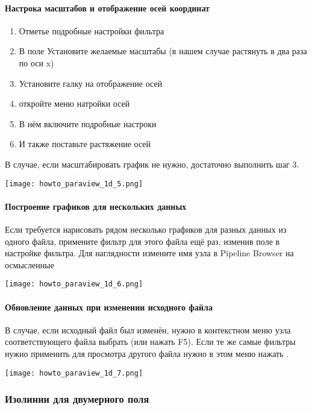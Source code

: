 \paragraph{Настрока масштабов и отображение осей координат}
\begin{enumerate}
\item Отметье подробные настройки фильтра
\item В поле  Установите желаемые масштабы (в нашем случае растянуть в два раза по оси x)
\item Установите галку на отображение осей
\item откройте меню натройки осей
\item В нём включите подробные настроки
\item И также поставьте растяжение осей
\end{enumerate}
В случае, если масштабировать график не нужно, достаточно выполнить шаг 3.
\begin{center}
\texttt{[image: howto\_paraview\_1d\_5.png]}
\end{center}

\paragraph{Построение графиков для нескольких данных}
Если требуется нарисовать рядом несколько графиков для разных данных из одного файла,
примените фильтр  для этого файла ещё раз, изменив поле  в настройке фильтра.
Для наглядности измените имя узла в Pipeline Browser на осмысленные
\begin{center}
\texttt{[image: howto\_paraview\_1d\_6.png]}
\end{center}

\paragraph{Обновление данных при изменении исходного файла}
В случае, если исходный файл был изменён, нужно в контекстном меню узла соответствующего файла
выбрать  (или нажать F5). Если те же самые фильтры нужно применить для просмотра другого файла
нужно в этом меню нажать .
\begin{center}
\texttt{[image: howto\_paraview\_1d\_7.png]}
\end{center}

\subsubsection{Изолинии для двумерного поля}
\label{sec:paraview-isolines}

